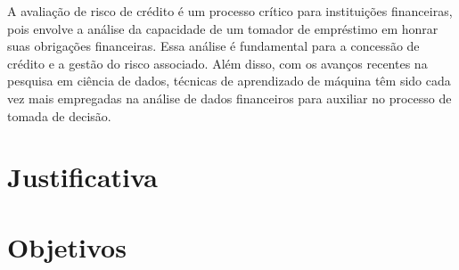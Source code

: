 A avaliação de risco de crédito é um processo crítico para instituições
financeiras, pois envolve a análise da capacidade de um tomador de empréstimo em
honrar suas obrigações financeiras. Essa análise é fundamental para a concessão
de crédito e a gestão do risco associado. Além disso, com os avanços recentes na
pesquisa em ciência de dados, técnicas de aprendizado de máquina têm
sido cada vez mais empregadas na análise de dados financeiros para
auxiliar no processo de tomada de decisão.

\section{Justificativa}
\label{sec:motivacao}


\section{Objetivos}
\label{sec:objetivos}

